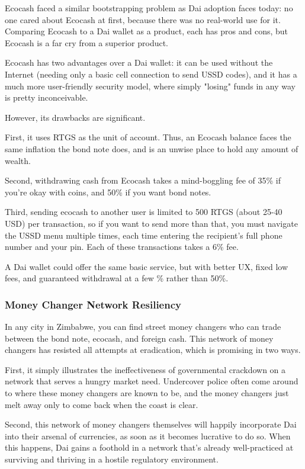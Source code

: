 \documentclass{article}
\begin{document}
Ecocash faced a similar bootstrapping problem as Dai adoption faces today: no one cared about Ecocash at first, because there was no real-world use for it. Comparing Ecocash to a Dai wallet as a product, each has pros and cons, but Ecocash is a far cry from a superior product.

Ecocash has two advantages over a Dai wallet: it can be used without the Internet (needing only a basic cell connection to send USSD codes), and it has a much more user-friendly security model, where simply "losing" funds in any way is pretty inconceivable.

However, its drawbacks are significant.

First, it uses RTGS as the unit of account. Thus, an Ecocash balance faces the same inflation the bond note does, and is an unwise place to hold any amount of wealth.

Second, withdrawing cash from Ecocash takes a mind-boggling fee of 35\% if you're okay with coins, and 50\% if you want bond notes.

Third, sending ecocash to another user is limited to 500 RTGS (about 25-40 USD) per transaction, so if you want to send more than that, you must navigate the USSD menu multiple times, each time entering the recipient's full phone number and your pin. Each of these transactions takes a 6\% fee.

A Dai wallet could offer the same basic service, but with better UX, fixed low fees, and guaranteed withdrawal at a few \% rather than 50\%.

\subsubsection{Money Changer Network Resiliency} \label{resilient money changers}

In any city in Zimbabwe, you can find street money changers who can trade between the bond note, ecocash, and foreign cash. This network of money changers has resisted all attempts at eradication, which is promising in two ways.

First, it simply illustrates the ineffectiveness of governmental crackdown on a network that serves a hungry market need. Undercover police often come around to where these money changers are known to be, and the money changers just melt away only to come back when the coast is clear. 

Second, this network of money changers themselves will happily incorporate Dai into their arsenal of currencies, as soon as it becomes lucrative to do so. When this happens, Dai gains a foothold in a network that's already well-practiced at surviving and thriving in a hostile regulatory
environment.
\end{document}
